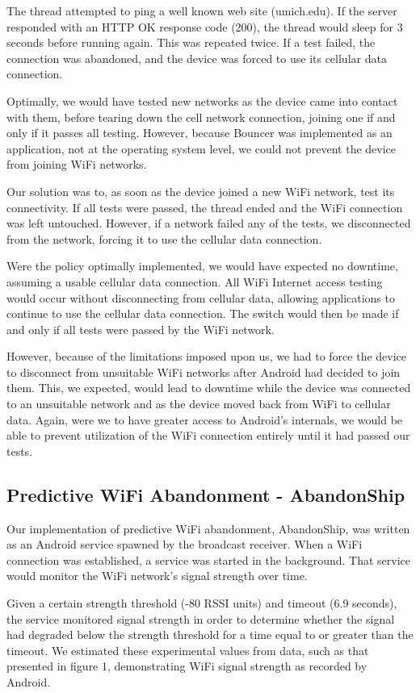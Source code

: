 The thread attempted to ping a well known web site (umich.edu). If the server responded with an HTTP OK response code (200), the thread would sleep for 3 seconds before running again. This was repeated twice. If a test failed, the connection was abandoned, and the device was forced to use its cellular data connection.

Optimally, we would have tested new networks as the device came into contact with them, before tearing down the cell network connection, joining one if and only if it passes all testing. However, because Bouncer was implemented as an application, not at the operating system level, we could not prevent the device from joining WiFi networks.

Our solution was to, as soon as the device joined a new WiFi network, test its connectivity. If all tests were passed, the thread ended and the WiFi connection was left untouched. However, if a network failed any of the tests, we disconnected from the network, forcing it to use the cellular data connection.

Were the policy optimally implemented, we would have expected no downtime, assuming a usable cellular data connection. All WiFi Internet access testing would occur without disconnecting from cellular data, allowing applications to continue to use the cellular data connection. The switch would then be made if and only if all tests were passed by the WiFi network.

However, because of the limitations imposed upon us, we had to force the device to disconnect from unsuitable WiFi networks after Android had decided to join them. This, we expected, would lead to downtime while the device was connected to an unsuitable network and as the device moved back from WiFi to cellular data. Again, were we to have greater access to Android's internals, we would be able to prevent utilization of the WiFi connection entirely until it had passed our tests.

\subsection{Predictive WiFi Abandonment - AbandonShip}
Our implementation of predictive WiFi abandonment, AbandonShip, was written as an Android service spawned by the broadcast receiver. When a WiFi connection was established, a service was started in the background. That service would monitor the WiFi network's signal strength over time.

Given a certain strength threshold (-80 RSSI units) and timeout (6.9 seconds), the service monitored signal strength in order to determine whether the signal had degraded below the strength threshold for a time equal to or greater than the timeout. We estimated these experimental values from data, such as that presented in figure 1, demonstrating WiFi signal strength as recorded by Android. 

